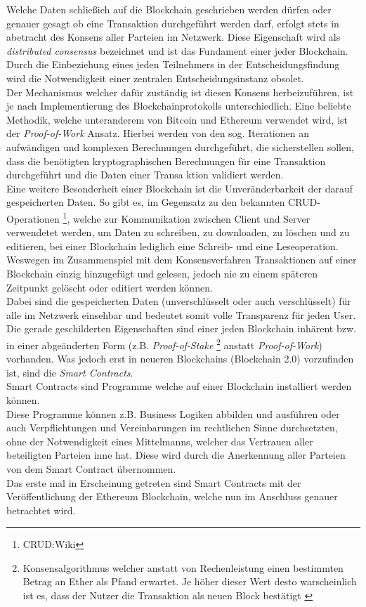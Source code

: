 Welche Daten schließich auf die Blockchain geschrieben werden dürfen oder genauer gesagt ob eine Transaktion durchgeführt werden darf, erfolgt stets in abetracht des Konsens aller Parteien im Netzwerk. Diese Eigenschaft wird als \textit{distributed consensus} bezeichnet und ist das Fundament einer jeder Blockchain. Durch die Einbeziehung eines jeden Teilnehmers in der Entscheidungsfindung wird die Notwendigkeit einer zentralen Entscheidungsinstanz obsolet. \\
Der Mechanismus welcher dafür zuständig ist diesen Konsens herbeizuführen, ist je nach Implementierung des Blockchainprotokolls unterschiedlich. Eine beliebte Methodik, welche unteranderem von Bitcoin und Ethereum verwendet wird, ist der  \textit{Proof-of-Work} Ansatz. Hierbei werden von den sog.  Iterationen an aufwändigen und komplexen Berechnungen durchgeführt, die sicherstellen sollen, dass die benötigten kryptographischen Berechnungen für eine Transaktion durchgeführt und die Daten einer Transa ktion validiert werden.\\
Eine weitere Besonderheit einer Blockchain ist die Unveränderbarkeit der darauf gespeicherten Daten. So gibt es, im Gegensatz zu den bekannten CRUD-Operationen \footnote{CRUD:Wiki}, welche zur Kommunikation zwischen Client und Server verwendetet werden, um Daten zu schreiben, zu downloaden, zu löschen und zu editieren, bei einer Blockchain lediglich eine Schreib- und eine Leseoperation. Weswegen im Zusammenspiel mit dem Konsensverfahren Transaktionen auf einer Blockchain einzig hinzugefügt und gelesen, jedoch nie zu einem späteren Zeitpunkt gelöscht oder editiert werden können. \\
Dabei sind die gespeicherten Daten (unverschlüsselt oder auch verschlüsselt) für alle im Netzwerk einsehbar und bedeutet somit volle Transparenz für jeden User. \\ 
Die gerade geschilderten Eigenschaften sind einer jeden Blockchain inhärent bzw. in einer abgeänderten Form (z.B. \textit{Proof-of-Stake} \footnote{Konsensalgorithmus welcher anstatt von Rechenleistung einen bestimmten Betrag an Ether als Pfand erwartet. Je höher dieser Wert desto warscheinlich ist es, dass der Nutzer die Transaktion als neuen Block bestätigt \cite{PoS:BTCE,PoS:Wiki}} anstatt \textit{Proof-of-Work}) vorhanden. 
Was jedoch erst in neueren Blockchains (Blockchain 2.0) vorzufinden ist, sind die \textit{Smart Contracts}.\\
Smart Contracts sind Programme welche auf einer Blockchain installiert werden können.\\
Diese Programme können z.B. Business Logiken abbilden und ausführen oder auch Verpflichtungen und Vereinbarungen im rechtlichen Sinne durchsetzten, ohne der Notwendigkeit eines Mittelmanns, welcher das Vertrauen aller beteiligten Parteien inne hat. Diese  wird durch die Anerkennung aller Parteien von dem Smart Contract übernommen. \\
Das erste mal in Erscheinung getreten sind Smart Contracts mit der Veröffentlichung der Ethereum Blockchain, welche nun im Anschluss genauer betrachtet wird.

